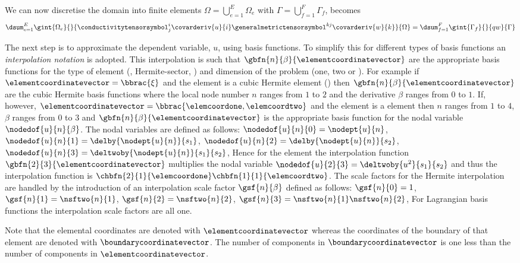 We can now discretise the domain into finite elements \ie $\Omega=
\displaystyle{\bigcup_{e=1}^{E}}\Omega_{e}$ with
$\Gamma=\displaystyle{\bigcup_{f=1}^{F}}\Gamma_{f}$, 
 becomes
\begin{equation}
  \dsum_{e=1}^{E}\gint{\Omega_{e}}{}{\conductivitytensorsymbol^{i}_{j}\covarderiv{u}{i}\generalmetrictensorsymbol^{kj}
    \covarderiv{w}{k}}{\Omega}
  =\dsum_{f=1}^{F}\gint{\Gamma_{f}}{}{qw}{\Gamma}
\end{equation}

The next step is to approximate the dependent variable, $u$, using basis
functions. To simplify this for different types of basis functions an
\emph{interpolation notation} is adopted. This interpolation is such that
$\gbfn{n}{\beta}{\elementcoordinatevector}$ are the appropriate basis functions for the
type of element (\eg \bicubicherm, Hermite-sector, \etc) and dimension of 
the problem (one, two or \threedal). For example if $\elementcoordinatevector=\bbrac{\xi}$ 
and the element is a cubic Hermite element
() then $\gbfn{n}{\beta}{\elementcoordinatevector}$ 
are the cubic Hermite basis functions where the local node number $n$ ranges 
from $1$ to $2$ and the derivative $\beta$ ranges from $0$ to $1$. If,
however, $\elementcoordinatevector=\bbrac{\elemcoordone,\elemcoordtwo}$ and the element is a \bicubicherm 
element then $n$ ranges from $1$ to $4$, $\beta$ ranges from $0$ to $3$ and
$\gbfn{n}{\beta}{\elementcoordinatevector}$ is the appropriate basis function for the nodal
variable $\nodedof{u}{n}{\beta}$. The nodal variables are defined as
follows: $\nodedof{u}{n}{0}=\nodept{u}{n}$,
$\nodedof{u}{n}{1}=\delby{\nodept{u}{n}}{s_{1}}$,
$\nodedof{u}{n}{2}=\delby{\nodept{u}{n}}{s_{2}}$,
$\nodedof{u}{n}{3}=\deltwoby{\nodept{u}{n}}{s_{1}}{s_{2}}$,
\etc Hence for the \bicubicherm element the interpolation function
$\gbfn{2}{3}{\elementcoordinatevector}$ multiplies the nodal variable
$\nodedof{u}{2}{3}=\deltwoby{u^{2}}{s_{1}}{s_{2}}$ and thus the
interpolation function is $\chbfn{2}{1}{\elemcoordone}\chbfn{1}{1}{\elemcoordtwo}$.  The
scale factors for the Hermite interpolation are handled by the introduction of
an interpolation scale factor $\gsf{n}{\beta}$ defined as follows:
$\gsf{n}{0}=1$, $\gsf{n}{1}=\nsftwo{n}{1}$, $\gsf{n}{2}=
\nsftwo{n}{2}$, $\gsf{n}{3}=\nsftwo{n}{1}\nsftwo{n}{2}$,
\etc For Lagrangian basis functions the interpolation scale factors are all
one.

Note that the elemental coordinates are denoted with
$\elementcoordinatevector$ whereas the coordinates of the boundary of
that element are denoted with $\boundarycoordinatevector$. The number
of components in $\boundarycoordinatevector$ is one less than the
number of components in $\elementcoordinatevector$.

